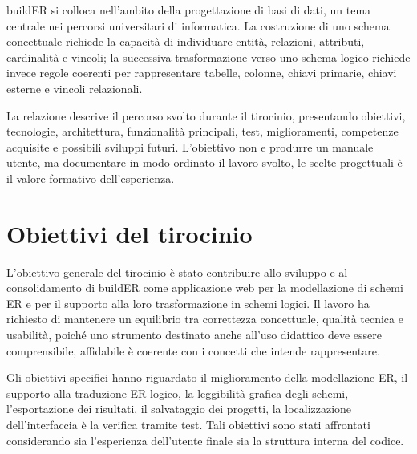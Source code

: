 \documentclass{unipd-thesis-modern}
\newcommand{\builder}{buildER}
\begin{document}
\builder{} si colloca nell'ambito della progettazione di basi di dati, un tema centrale nei percorsi universitari di informatica. La costruzione di uno schema concettuale richiede la capacità di individuare entità, relazioni, attributi, cardinalità e vincoli; la successiva trasformazione verso uno schema logico richiede invece regole coerenti per rappresentare tabelle, colonne, chiavi primarie, chiavi esterne e vincoli relazionali.

La relazione descrive il percorso svolto durante il tirocinio, presentando obiettivi, tecnologie, architettura, funzionalità principali, test, miglioramenti, competenze acquisite e possibili sviluppi futuri. L'obiettivo non e produrre un manuale utente, ma documentare in modo ordinato il lavoro svolto, le scelte progettuali è il valore formativo dell'esperienza.

\chapter{Obiettivi del tirocinio}

L'obiettivo generale del tirocinio è stato contribuire allo sviluppo e al consolidamento di \builder{} come applicazione web per la modellazione di schemi ER e per il supporto alla loro trasformazione in schemi logici. Il lavoro ha richiesto di mantenere un equilibrio tra correttezza concettuale, qualità tecnica e usabilità, poiché uno strumento destinato anche all'uso didattico deve essere comprensibile, affidabile è coerente con i concetti che intende rappresentare.

Gli obiettivi specifici hanno riguardato il miglioramento della modellazione ER, il supporto alla traduzione ER-logico, la leggibilità grafica degli schemi, l'esportazione dei risultati, il salvataggio dei progetti, la localizzazione dell'interfaccia è la verifica tramite test. Tali obiettivi sono stati affrontati considerando sia l'esperienza dell'utente finale sia la struttura interna del codice.
\end{document}
